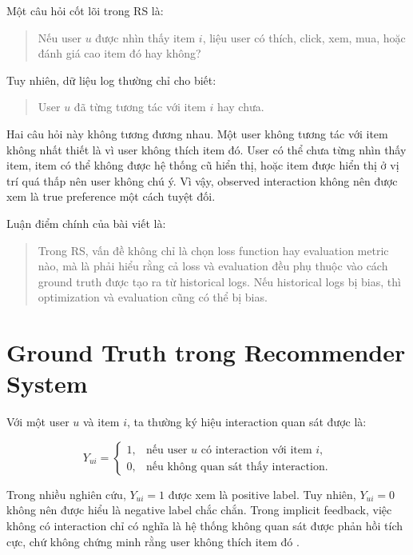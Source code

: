\documentclass[12pt,a4paper]{article}
\begin{document}
Một câu hỏi cốt lõi trong RS là:

\begin{quote}
Nếu user $u$ được nhìn thấy item $i$, liệu user có thích, click, xem, mua, hoặc đánh giá cao item đó hay không?
\end{quote}

Tuy nhiên, dữ liệu log thường chỉ cho biết:

\begin{quote}
User $u$ đã từng tương tác với item $i$ hay chưa.
\end{quote}

Hai câu hỏi này không tương đương nhau. Một user không tương tác với item không nhất thiết là vì user không thích item đó. User có thể chưa từng nhìn thấy item, item có thể không được hệ thống cũ hiển thị, hoặc item được hiển thị ở vị trí quá thấp nên user không chú ý. Vì vậy, observed interaction không nên được xem là true preference một cách tuyệt đối.

Luận điểm chính của bài viết là:

\begin{quote}
Trong RS, vấn đề không chỉ là chọn loss function hay evaluation metric nào, mà là phải hiểu rằng cả loss và evaluation đều phụ thuộc vào cách ground truth được tạo ra từ historical logs. Nếu historical logs bị bias, thì optimization và evaluation cũng có thể bị bias.
\end{quote}

\section{Ground Truth trong Recommender System}

Với một user $u$ và item $i$, ta thường ký hiệu interaction quan sát được là:

\begin{equation}
Y_{ui} =
\begin{cases}
1, & \text{nếu user } u \text{ có interaction với item } i, \\
0, & \text{nếu không quan sát thấy interaction.}
\end{cases}
\end{equation}

Trong nhiều nghiên cứu, $Y_{ui}=1$ được xem là positive label. Tuy nhiên, $Y_{ui}=0$ không nên được hiểu là negative label chắc chắn. Trong implicit feedback, việc không có interaction chỉ có nghĩa là hệ thống không quan sát được phản hồi tích cực, chứ không chứng minh rằng user không thích item đó \cite{saito2020unbiased}.
\end{document}
